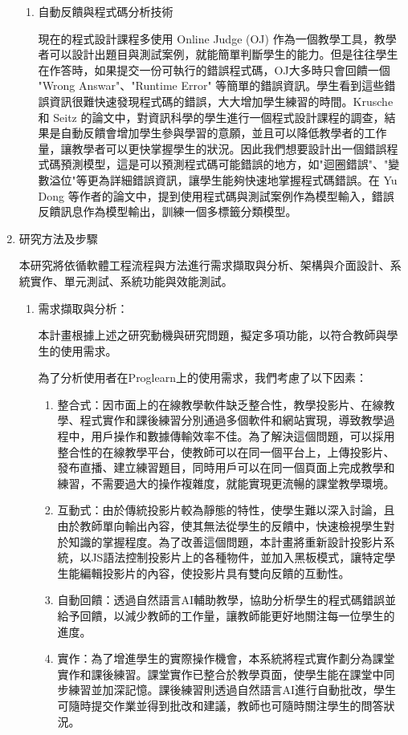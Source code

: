 \documentclass[12pt]{article}
\begin{document}
\begin{enumerate}
\begin{enumerate}
      \item 自動反饋與程式碼分析技術
        \par 現在的程式設計課程多使用 Online Judge (OJ) 作為一個教學工具，教學者可以設計出題目與測試案例，就能簡單判斷學生的能力。但是往往學生在作答時，如果提交一份可執行的錯誤程式碼，OJ大多時只會回饋一個 "Wrong Answar"、"Runtime Error" 等簡單的錯誤資訊。學生看到這些錯誤資訊很難快速發現程式碼的錯誤，大大增加學生練習的時間。Krusche 和 Seitz 的論文中，對資訊科學的學生進行一個程式設計課程的調查，結果是自動反饋會增加學生參與學習的意願，並且可以降低教學者的工作量，讓教學者可以更快掌握學生的狀況。因此我們想要設計出一個錯誤程式碼預測模型，這是可以預測程式碼可能錯誤的地方，如"迴圈錯誤"、"變數溢位"等更為詳細錯誤資訊，讓學生能夠快速地掌握程式碼錯誤。在 Yu Dong 等作者的論文中，提到使用程式碼與測試案例作為模型輸入，錯誤反饋訊息作為模型輸出，訓練一個多標籤分類模型。
    \end{enumerate}
  \item 研究方法及步驟
    \par 本研究將依循軟體工程流程與方法進行需求擷取與分析、架構與介面設計、系統實作、單元測試、系統功能與效能測試。
    \begin{enumerate}
      \setlength{\parindent}{2em}
      \item 需求擷取與分析：
        \par 本計畫根據上述之研究動機與研究問題，擬定多項功能，以符合教師與學生的使用需求。
        \par 為了分析使用者在Proglearn上的使用需求，我們考慮了以下因素：
        \begin{enumerate}
          \item 整合式：因市面上的在線教學軟件缺乏整合性，教學投影片、在線教學、程式實作和課後練習分別通過多個軟件和網站實現，導致教學過程中，用戶操作和數據傳輸效率不佳。為了解決這個問題，可以採用整合性的在線教學平台，使教師可以在同一個平台上，上傳投影片、發布直播、建立練習題目，同時用戶可以在同一個頁面上完成教學和練習，不需要過大的操作複雜度，就能實現更流暢的課堂教學環境。
          \item 互動式：由於傳統投影片較為靜態的特性，使學生難以深入討論，且由於教師單向輸出內容，使其無法從學生的反饋中，快速檢視學生對於知識的掌握程度。為了改善這個問題，本計畫將重新設計投影片系統，以JS語法控制投影片上的各種物件，並加入黑板模式，讓特定學生能編輯投影片的內容，使投影片具有雙向反饋的互動性。
          \item 自動回饋：透過自然語言AI輔助教學，協助分析學生的程式碼錯誤並給予回饋，以減少教師的工作量，讓教師能更好地關注每一位學生的進度。
          \item 實作：為了增進學生的實際操作機會，本系統將程式實作劃分為課堂實作和課後練習。課堂實作已整合於教學頁面，使學生能在課堂中同步練習並加深記憶。課後練習則透過自然語言AI進行自動批改，學生可隨時提交作業並得到批改和建議，教師也可隨時關注學生的問答狀況。

\end{enumerate}
\end{enumerate}
\end{enumerate}
\end{document}
